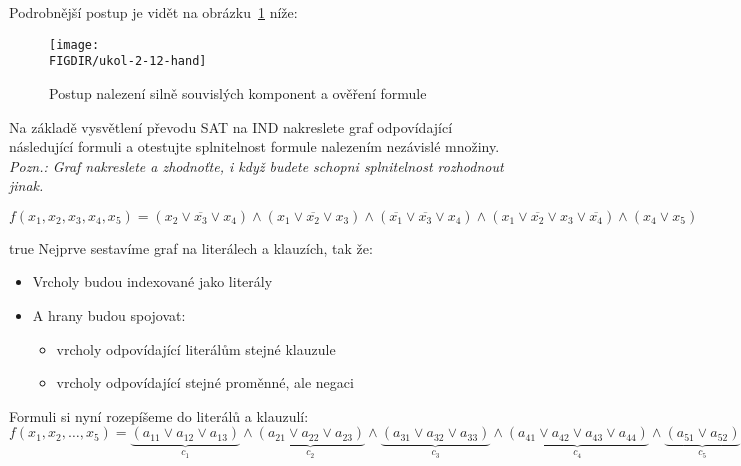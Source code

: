 \documentclass[10pt, a4paper]{ReportSheet}
\begin{document}
\begin{uloha}{12}{2}
        Podrobnější postup je vidět na obrázku~\ref{fig:ukol-2-12-hand} níže:
        \begin{figure}[H]
            \centering
            \texttt{[image: \\FIGDIR/ukol-2-12-hand]}
            \caption{Postup nalezení silně souvislých komponent a ověření formule}
            \label{fig:ukol-2-12-hand}
        \end{figure}

    \end{uloha}

    \begin{uloha}{13}{2}{
        Na základě vysvětlení převodu SAT na IND nakreslete graf odpovídající následující formuli a otestujte splnitelnost formule nalezením nezávislé množiny.
        \textit{Pozn.: Graf nakreslete a zhodnoťte, i když budete schopni splnitelnost rozhodnout jinak.}

        \begin{equation*}
            f(x_1, x_2, x_3, x_4, x_5) = (x_2 \lor \overline{x_3} \lor x_4) \land (x_1 \lor \overline{x_2} \lor x_3) \land (\overline{x_1}
            \lor \overline{x_3}
            \lor
            x_4) \land (x_1 \lor \overline{x_2} \lor x_3 \lor \overline{x_4}) \land (x_4 \lor x_5)
        \end{equation*}
    }{true}
        Nejprve sestavíme graf na literálech a klauzích, tak že:
        \begin{itemize}
            \item Vrcholy budou indexované jako literály
            \item A hrany budou spojovat:
            \begin{itemize}
                \item vrcholy odpovídající literálům stejné klauzule
                \item vrcholy odpovídající stejné proměnné, ale negaci
            \end{itemize}
        \end{itemize}

        Formuli si nyní rozepíšeme do literálů a klauzulí:
        \begin{equation*}
            f(x_1, x_2, \dots, x_5) =
            \underbrace{(a_{11} \lor a_{12} \lor a_{13})}_{c_1} \land
            \underbrace{(a_{21} \lor a_{22} \lor a_{23})}_{c_2} \land
            \underbrace{(a_{31} \lor a_{32} \lor a_{33})}_{c_3} \land
            \underbrace{(a_{41} \lor a_{42} \lor a_{43} \lor a_{44})}_{c_4} \land
            \underbrace{(a_{51} \lor a_{52})}_{c_5}
        \end{equation*}


\end{uloha}
\end{document}
